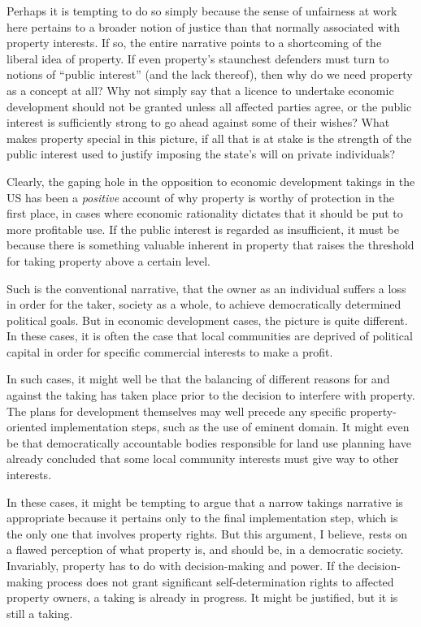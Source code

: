 Perhaps it is tempting to do so simply because the sense of unfairness at work here pertains to a broader notion of justice than that normally associated with property interests. If so, the entire narrative points to a shortcoming of the liberal idea of property. If even property's staunchest defenders must turn to notions of ``public interest'' (and the lack thereof), then why do we need property as a concept at all? Why not simply say that a licence to undertake economic development should not be granted unless all affected parties agree, or the public interest is sufficiently strong to go ahead against some of their wishes? What makes property special in this picture, if all that is at stake is the strength of the public interest used to justify imposing the state's will on private individuals?

Clearly, the gaping hole in the opposition to economic development takings in the US has been a {\it positive} account of why property is worthy of protection in the first place, in cases where economic rationality dictates that it should be put to more profitable use. If the public interest is regarded as insufficient, it must be because there is something valuable inherent in property that raises the threshold for taking property above a certain level.

Such is the conventional narrative, that the owner as an individual suffers a loss in order for the taker, society as a whole, to achieve democratically determined political goals. But in economic development cases, the picture is quite different. In these cases, it is often the case that local communities are deprived of political capital in order for specific commercial interests to make a profit. 

In such cases, it might well be that the balancing of different reasons for and against the taking has taken place prior to the decision to interfere with property. The plans for development themselves may well precede any specific property-oriented implementation steps, such as the use of eminent domain. It might even be that democratically accountable bodies responsible for land use planning have already concluded that some local community interests must give way to other interests.

In these cases, it might be tempting to argue that a narrow takings narrative is appropriate because it pertains only to the final implementation step, which is the only one that involves property rights. But this argument, I believe, rests on a flawed perception of what property is, and should be, in a democratic society. Invariably, property has to do with decision-making and power. If the decision-making process does not grant significant self-determination rights to affected property owners, a taking is already in progress. It might be justified, but it is still a taking. 

